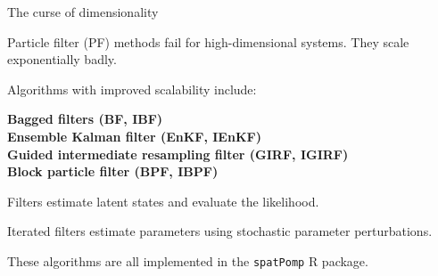 \documentclass{beamer}
\begin{document}
\begin{frame}{The curse of dimensionality}

  \bi
  \item
    Particle filter (PF) methods fail for high-dimensional systems. They scale exponentially badly.

    \vspace{2mm}
    
  \item Algorithms with improved scalability include:\\

    \vspace{1mm}
    
  {\bf
  Bagged filters (BF, IBF)\\
  Ensemble Kalman filter (EnKF, IEnKF)\\
  Guided intermediate resampling filter (GIRF, IGIRF)\\
  Block particle filter (BPF, IBPF)\\
  }

      \vspace{2mm}

\item Filters estimate latent states and evaluate the likelihood.

    \vspace{2mm}

  \item Iterated filters estimate parameters using stochastic parameter perturbations.

        \vspace{2mm}

\item These algorithms are all implemented in the \texttt{spatPomp} R package.
  
  \ei
  
\end{frame}
\end{document}
